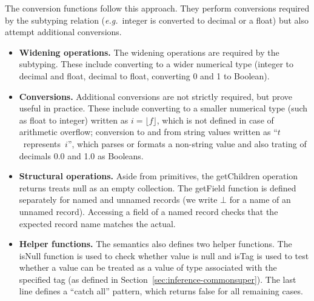 \documentclass[preprint]{sigplanconf}
\newcommand{\kvd}[1]{\textnormal{\textcolor{kvdclr}{\sffamily #1}}}
\newcommand{\ident}[1]{\textnormal{\sffamily #1}}
\begin{document}
The conversion functions follow this approach. They perform conversions required by the subtyping relation
(\emph{e.g.}~integer is converted to decimal or a float) but also attempt additional conversions.

\begin{itemize}
\item \textbf{Widening operations.} The widening operations are required by the subtyping. These include
  converting to a wider numerical type (integer to decimal and float, decimal to float, converting 0 and 
  1 to Boolean).

\item \textbf{Conversions.} Additional conversions are not strictly required, but prove useful in practice.
  These include converting to a smaller numerical type (such as float to integer) written as $i=\lfloor f\rfloor$,
  which is not defined in case of arithmetic overflow; conversion to and from string values written as
  ``$t$~represents~$i$'', which parses or formats a non-string value and also trating of decimals 
  0.0 and 1.0 as Booleans.

\item \textbf{Structural operations.} Aside from primitives, the \ident{getChildren} operation returns treats
  \kvd{null} as an empty collection. The \ident{getField} function is defined separately for named and unnamed
  records (we write $\bot$ for a name of an unnamed record). Accessing a field of a named record checks that 
  the expected record name matches the actual.

\item \textbf{Helper functions.} The semantics also defines two helper functions. The \ident{isNull} function
  is used to check whether value is \kvd{null} and \ident{isTag} is used to test whether a value can be treated 
  as a value of type associated with the specified tag (as defined in Section~\ref{sec:inference-commonsuper}).
  The last line defines a ``catch all'' pattern, which returns \kvd{false} for all remaining cases.
\end{itemize}

\end{document}
